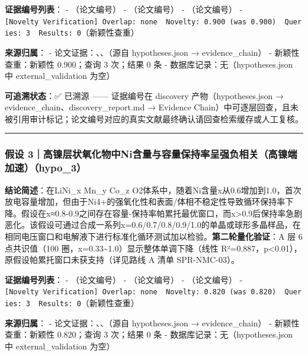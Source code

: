 \documentclass[12pt,a4paper]{ctexart}
\begin{document}
\textbf{证据编号列表}： - \texttt{\cite{p27}}（论文编号） - \texttt{\cite{p31}}（论文编号） - \texttt{\cite{p32}}（论文编号） - \texttt{{[}Novelty\ Verification{]}\ Overlap:\ none\ \textbar{}\ Novelty:\ 0.900\ (was\ 0.900)\ \textbar{}\ Queries:\ 3\ \textbar{}\ Results:\ 0}（新颖性查重）

\textbf{来源归属}： - 论文证据：\texttt{\cite{p27}}、\texttt{\cite{p31}}、\texttt{\cite{p32}}（源自 hypotheses.json → evidence\_chain） - 新颖性查重：新颖性 0.900；查询 3 次；结果 0 条 - 数据库记录：无（hypotheses.json 中 external\_validation 为空）

\textbf{可追溯状态}：✅ 已溯源 ------ 证据编号在 discovery 产物（hypotheses.json → evidence\_chain、discovery\_report.md → Evidence Chain）中可逐层回查，且未被引用审计标记；论文编号对应的真实文献最终确认请回查检索缓存或人工复核。

\begin{center}\rule{0.5\linewidth}{0.5pt}\end{center}

\subsubsection{假设 3｜高镍层状氧化物中Ni含量与容量保持率呈强负相关（高镍端加速）（hypo\_3）}\label{ux5047ux8bbe-3ux9ad8ux954dux5c42ux72b6ux6c27ux5316ux7269ux4e2dniux542bux91cfux4e0eux5bb9ux91cfux4fddux6301ux7387ux5448ux5f3aux8d1fux76f8ux5173ux9ad8ux954dux7aefux52a0ux901fhypo_3}

\textbf{结论简述}：在LiNi\_x Mn\_y Co\_z O2体系中，随着Ni含量x从0.6增加到1.0，首次放电容量增加，但由于Ni4+的强氧化性和表面/体相不稳定性导致循环保持率下降。假设在x≈0.8-0.9之间存在容量-保持率帕累托最优窗口，而x\textgreater0.9后保持率急剧恶化。该假设可通过合成一系列x=0.6/0.7/0.8/0.9/1.0的单晶或球形多晶样品，在相同电压窗口和电解液下进行标准化循环测试加以检验。\textbf{第二轮量化验证}：A 层 6 点共识值（100 圈，x=0.33\textasciitilde1.0）显示整体单调下降（线性 R²=0.887，p\textless0.01），原假设帕累托窗口未获支持（详见路线 A 清单 SPR-NMC-03）。

\textbf{证据编号列表}： - \texttt{\cite{p22}}（论文编号） - \texttt{\cite{p24}}（论文编号） - \texttt{\cite{p32}}（论文编号） - \texttt{{[}Novelty\ Verification{]}\ Overlap:\ none\ \textbar{}\ Novelty:\ 0.820\ (was\ 0.820)\ \textbar{}\ Queries:\ 3\ \textbar{}\ Results:\ 0}（新颖性查重）

\textbf{来源归属}： - 论文证据：\texttt{\cite{p22}}、\texttt{\cite{p24}}、\texttt{\cite{p32}}（源自 hypotheses.json → evidence\_chain） - 新颖性查重：新颖性 0.820；查询 3 次；结果 0 条 - 数据库记录：无（hypotheses.json 中 external\_validation 为空）
\end{document}
